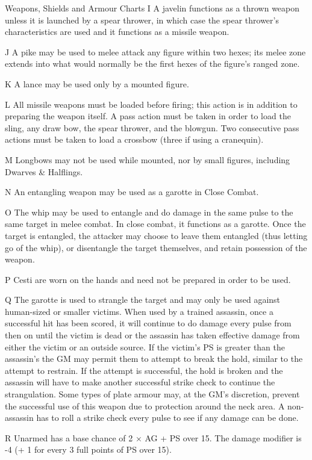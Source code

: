 \begin{Table}{Weapons, Shields and Armour Charts}
I A javelin functions as a thrown weapon unless it is launched by a
spear thrower, in which case the spear thrower’s characteristics are
used and it functions as a missile weapon.

J A pike may be used to melee attack any figure within two hexes; its
melee zone extends into what would normally be the first hexes of the
figure’s ranged zone.

K A lance may be used only by a mounted figure. 

L All missile weapons must be loaded before firing; this action is
in addition to preparing the weapon itself. A pass action must be
taken in order to load the sling, any draw bow, the spear thrower, and
the blowgun.  Two consecutive pass actions must be taken to load a
crossbow (three if using a cranequin).

M Longbows may not be used while mounted, nor by small figures,
including Dwarves \& Halflings.

N An entangling weapon may be used as a garotte in Close Combat.

O The whip may be used to entangle and do damage in the same pulse
to the same target in melee combat.  In close combat, it functions as
a garotte.  Once the target is entangled, the attacker may choose to
leave them entangled (thus letting go of the whip), or disentangle the
target themselves, and retain possession of the weapon.

P Cesti are worn on the hands and need not be prepared in order to be
used.

Q The garotte is used to strangle the target and may only be used
against human-sized or smaller victims.  When used by a trained
assassin, once a successful hit has been scored, it will continue to
do damage every pulse from then on until the victim is dead or the
assassin has taken effective damage from either the victim or an
outside source.  If the victim’s PS is greater than the assassin’s the
GM may permit them to attempt to break the hold, similar to the
attempt to restrain.  If the attempt is successful, the hold is broken
and the assassin will have to make another successful strike check to
continue the strangulation.  Some types of plate armour may, at the
GM’s discretion, prevent the successful use of this weapon due to
protection around the neck area.  A non-assassin has to roll a strike
check every pulse to see if any damage can be done.

R Unarmed has a base chance of 2 × AG + PS over 15. The damage
modifier is -4 (+ 1 for every 3 full points of PS over 15).


\end{Table}
